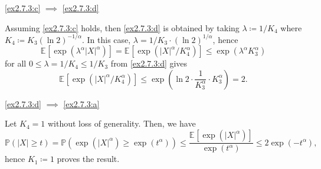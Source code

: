 \begin{answer}
	\begin{claim}
		\autoref{ex2.7.3:c} \(\implies \) \autoref{ex2.7.3:d}
	\end{claim}
	\begin{explanation}
		Assuming \autoref{ex2.7.3:c} holds, then \autoref{ex2.7.3:d} is obtained by taking \(\lambda \coloneqq 1 / K_4\) where \(K_4 \coloneqq K_3 (\ln 2)^{-1 / \alpha }\). In this case, \(\lambda = 1 / K_3 \cdot (\ln 2)^{1 / \alpha }\), hence
		\[
			\mathbb{E}_{}[\exp (\lambda ^\alpha \vert X \vert ^\alpha )]
			= \mathbb{E}_{}[\exp (\vert X \vert ^\alpha / K_4^\alpha )]
			\leq \exp (\lambda ^\alpha K_3^\alpha )
		\]
		for all \(0 \leq \lambda = 1 / K_4 \leq 1 / K_3\) from \autoref{ex2.7.3:d} gives
		\[
			\mathbb{E}_{}[\exp (\vert X \vert ^\alpha / K_4 ^\alpha )]
			\leq \exp (\ln 2 \cdot \frac{1}{K_3^\alpha} \cdot K_3^\alpha )
			= 2.
		\]
	\end{explanation}

	\begin{claim}
		\autoref{ex2.7.3:d} \(\implies \) \autoref{ex2.7.3:a}
	\end{claim}
	\begin{explanation}
		Let \(K_4 = 1\) without loss of generality. Then, we have
		\[
			\mathbb{P} (\vert X \vert \geq t)
			= \mathbb{P} (\exp (\vert X \vert ^\alpha ) \geq \exp (t^\alpha ))
			\leq \frac{\mathbb{E}_{}[\exp (\vert X \vert ^\alpha )] }{\exp (t^\alpha )}
			\leq 2 \exp (-t^\alpha ),
		\]
		hence \(K_1 \coloneqq 1\) proves the result.
	\end{explanation}
\end{answer}

